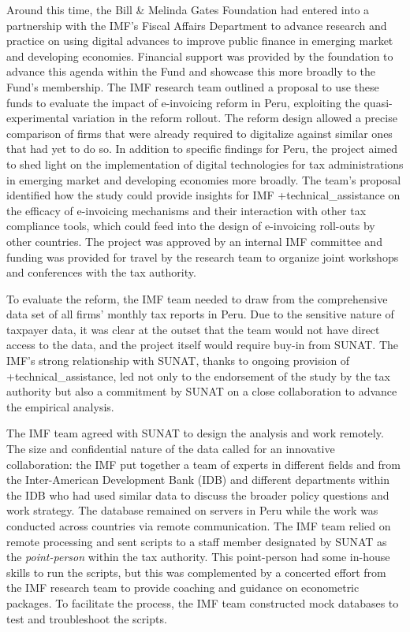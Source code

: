 \documentclass[
]{WileySix}
\begin{document}
Around this time, the Bill \& Melinda Gates Foundation had entered into a partnership with the IMF's Fiscal Affairs Department to advance research and practice on using digital advances to improve public finance in emerging market and developing economies. Financial support was provided by the foundation to advance this agenda within the Fund and showcase this more broadly to the Fund's membership. The IMF research team outlined a proposal to use these funds to evaluate the impact of e-invoicing reform in Peru, exploiting the quasi-experimental variation in the reform rollout. The reform design allowed a precise comparison of firms that were already required to digitalize against similar ones that had yet to do so. In addition to specific findings for Peru, the project aimed to shed light on the implementation of digital technologies for tax administrations in emerging market and developing economies more broadly. The team's proposal identified how the study could provide insights for IMF +technical\_assistance\textbar{} on the efficacy of e-invoicing mechanisms and their interaction with other tax compliance tools, which could feed into the design of e-invoicing roll-outs by other countries. The project was approved by an internal IMF committee and funding was provided for travel by the research team to organize joint workshops and conferences with the tax authority.

To evaluate the reform, the IMF team needed to draw from the comprehensive data set of all firms' monthly tax reports in Peru. Due to the sensitive nature of taxpayer data, it was clear at the outset that the team would not have direct access to the data, and the project itself would require buy-in from SUNAT. The IMF's strong relationship with SUNAT, thanks to ongoing provision of +technical\_assistance\textbar, led not only to the endorsement of the study by the tax authority but also a commitment by SUNAT on a close collaboration to advance the empirical analysis.

The IMF team agreed with SUNAT to design the analysis and work remotely. The size and confidential nature of the data called for an innovative collaboration: the IMF put together a team of experts in different fields and from the Inter-American Development Bank (IDB) and different departments within the IDB who had used similar data to discuss the broader policy questions and work strategy. The database remained on servers in Peru while the work was conducted across countries via remote communication. The IMF team relied on remote processing and sent scripts to a staff member designated by SUNAT as the \emph{point-person} within the tax authority. This point-person had some in-house skills to run the scripts, but this was complemented by a concerted effort from the IMF research team to provide coaching and guidance on econometric packages. To facilitate the process, the IMF team constructed mock databases to test and troubleshoot the scripts.
\end{document}

